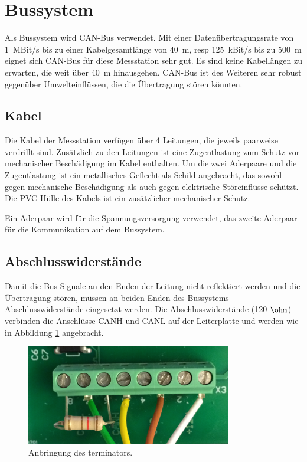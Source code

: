 \section{Bussystem}\label{sec.manualbus}
Als Bussystem wird CAN-Bus verwendet. Mit einer Datenübertragungsrate von 1~MBit/s bis zu einer Kabelgesamtlänge von 40~m, resp 125~kBit/s bis zu 500~m eignet sich CAN-Bus für diese Messstation sehr gut. Es sind keine Kabellängen zu erwarten, die weit über 40~m hinausgehen. CAN-Bus ist des Weiteren sehr robust gegenüber Umwelteinflüssen, die die Übertragung stören könnten.

\subsection{Kabel}
Die Kabel der Messstation verfügen über 4 Leitungen, die jeweils paarweise verdrillt sind. Zusätzlich zu den Leitungen ist eine Zugentlastung zum Schutz vor mechanischer Beschädigung im Kabel enthalten. Um die zwei Aderpaare und die Zugentlastung ist ein metallisches Geflecht als Schild angebracht, das sowohl gegen mechanische Beschädigung als auch gegen elektrische Störeinflüsse schützt. Die PVC-Hülle des Kabels ist ein zusätzlicher mechanischer Schutz. 

Ein Aderpaar wird für die Spannungsversorgung verwendet, das zweite Aderpaar für die Kommunikation auf dem Bussystem.

\subsection{Abschlusswiderstände}
Damit die Bus-Signale an den Enden der Leitung nicht reflektiert werden und die Übertragung stören, müssen an beiden Enden des Bussystems Abschlusswiderstände eingesetzt werden.  Die Abschlusswiderstände (120 \ensuremath{\ohm}) verbinden die Anschlüsse CANH und CANL auf der Leiterplatte und werden wie in Abbildung \ref{fig.terminator} angebracht.

\begin{figure}
	\centering
		\includegraphics[width=0.8\textwidth]{images/fotos/terminator.png}
	\caption{Anbringung des \gls{terminator}s.}
	\label{fig.terminator}
\end{figure}

